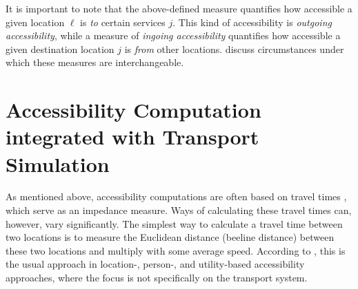 
It is important to note that the above-defined measure quantifies how accessible a given location $\ell$ is \emph{to} certain
services $j$. This kind of accessibility is \emph{outgoing accessibility},
while a measure of \emph{ingoing accessibility} quantifies how accessible a given
destination location $j$ is \emph{from} other locations. \citet{NicolaiNagelHiResAccessibilityMethod} 
discuss circumstances under which these measures are interchangeable.

\section{Accessibility Computation integrated with Transport Simulation}
\label{sec:integrated}
As mentioned above, accessibility computations are often based on travel times 
\citep{BBSRErreichbarkeitsmodell, BuettnerEtAl2010Erreichbarkeitsatlas}, which serve as an impedance measure.
Ways of calculating these travel times can, however, vary significantly. 
The simplest way to calculate a travel time between two locations is to measure the Euclidean distance 
(beeline distance) between these two locations and multiply with some average speed.
According to \citet{Geurs2004AccessibilityReview}, this is the 
usual 
approach in location-, person-, and utility-based accessibility approaches, where the focus 
is not specifically on the transport system.


